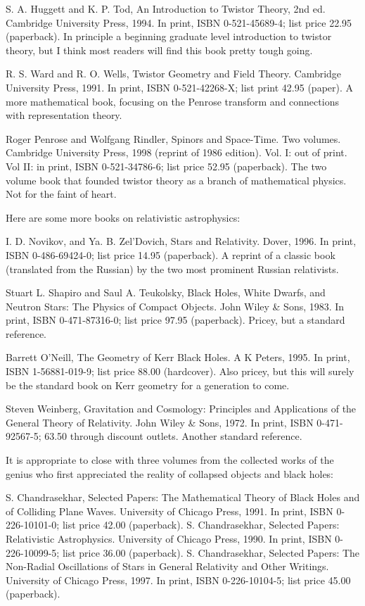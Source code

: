 \documentclass[10pt,a4paper]{book}
\theoremstyle{definition}
\begin{document}
S. A. Huggett and K. P. Tod,
An Introduction to Twistor Theory, 2nd ed.
Cambridge University Press, 1994.
In print, ISBN 0-521-45689-4; list price 22.95 (paperback).
In principle a beginning graduate level introduction to twistor theory, but I think most readers will find this book pretty tough going.

R. S. Ward and R. O. Wells,
Twistor Geometry and Field Theory.
Cambridge University Press, 1991.
In print, ISBN 0-521-42268-X; list print 42.95 (paper).
A more mathematical book, focusing on the Penrose transform and connections with representation theory.

Roger Penrose and Wolfgang Rindler,
Spinors and Space-Time.  Two volumes.
Cambridge University Press, 1998 (reprint of 1986 edition).
Vol. I: out of print.
Vol II: in print, ISBN 0-521-34786-6; list price 52.95 (paperback).
The two volume book that founded twistor theory as a branch of mathematical physics.  Not for the faint of heart.

Here are some more books on relativistic astrophysics:

I. D. Novikov, and Ya. B. Zel'Dovich,
Stars and Relativity.
Dover, 1996.
In print, ISBN 0-486-69424-0; list price 14.95 (paperback).
A reprint of a classic book (translated from the Russian) by the two most prominent Russian relativists.

Stuart L. Shapiro and Saul A. Teukolsky,
Black Holes, White Dwarfs, and Neutron Stars: The Physics of Compact Objects.
John Wiley \& Sons, 1983.
In print, ISBN 0-471-87316-0; list price 97.95 (paperback).
Pricey, but a standard reference.

Barrett O'Neill,
The Geometry of Kerr Black Holes.
A K Peters, 1995.
In print, ISBN 1-56881-019-9; list price 88.00 (hardcover).
Also pricey, but this will surely be the standard book on Kerr geometry for a generation to come.

Steven Weinberg,
Gravitation and Cosmology: Principles and Applications of the General Theory of Relativity.
John Wiley \& Sons, 1972.
In print, ISBN 0-471-92567-5; 63.50 through discount outlets.
Another standard reference.

It is appropriate to close with three volumes from the collected works of the genius who first appreciated the reality of collapsed objects and black holes:

S. Chandrasekhar,
Selected Papers: The Mathematical Theory of Black Holes and of Colliding Plane Waves.
University of Chicago Press, 1991.
In print, ISBN 0-226-10101-0; list price 42.00 (paperback).
S. Chandrasekhar,
Selected Papers: Relativistic Astrophysics.
University of Chicago Press, 1990.
In print, ISBN 0-226-10099-5; list price 36.00 (paperback).
S. Chandrasekhar,
Selected Papers: The Non-Radial Oscillations of Stars in General Relativity and Other Writings.
University of Chicago Press, 1997.
In print, ISBN 0-226-10104-5; list price 45.00 (paperback).
\end{document}
